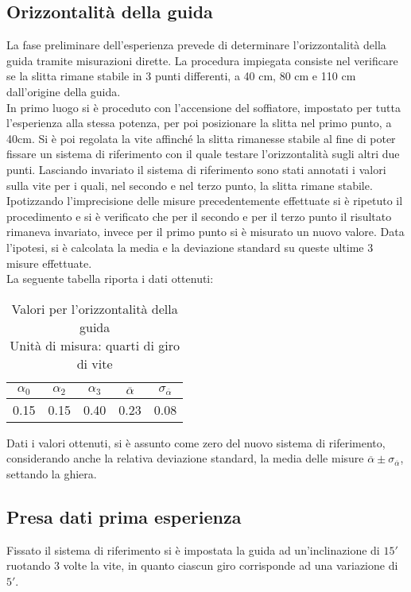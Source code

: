 \documentclass[a4paper,11pt,oneside]{article}
\begin{document}
\subsection{Orizzontalità della guida}
La fase preliminare dell'esperienza prevede di determinare l'orizzontalità della guida tramite misurazioni dirette. La procedura impiegata consiste nel verificare se la slitta rimane stabile in 3 punti differenti, a 40 cm, 80 cm e 110 cm dall'origine della guida.\\
In primo luogo si è proceduto con l'accensione del soffiatore, impostato per tutta l'esperienza alla stessa potenza, per poi posizionare la slitta nel primo punto, a 40cm. Si è poi regolata la vite affinché la slitta rimanesse stabile al fine di poter fissare un sistema di riferimento con il quale testare l'orizzontalità sugli altri due punti. Lasciando invariato il sistema di riferimento sono stati annotati i valori sulla vite per i quali, nel secondo  e nel terzo punto, la slitta rimane stabile.\\
Ipotizzando l'imprecisione delle misure precedentemente effettuate si è ripetuto il procedimento e si è verificato che per il secondo e per il terzo punto il risultato rimaneva invariato, invece per il primo punto si è misurato un nuovo valore. Data l'ipotesi, si è calcolata la media e la deviazione standard su queste ultime 3 misure effettuate.\\
La seguente tabella riporta i dati ottenuti:

\begin{table}[h!]
    \centering
    \caption{Valori per l'orizzontalità della guida \\ Unità di misura: quarti di giro di vite}
\begin{tabular}{ccc|cc}
    \toprule
    $\alpha_{0}$&$\alpha_{2}$&$\alpha_{3}$&$\overline{\alpha}$&$\sigma_{\overline{\alpha}}$\\
    \midrule
    0.15&0.15&0.40&0.23&0.08\\
    \bottomrule
    \end{tabular}
    \label{tab:guida_orizzontale}
\end{table}

Dati i valori ottenuti, si è assunto come zero del nuovo sistema di riferimento, considerando anche la relativa deviazione standard, la media delle misure $\overline{\alpha} \pm \sigma_{\overline{\alpha}}$, settando la ghiera.\\


\subsection{Presa dati prima esperienza}
Fissato il sistema di riferimento si è impostata la guida ad un'inclinazione di $15'$ ruotando 3 volte la vite, in quanto ciascun giro corrisponde ad una variazione  di $5'$.\\
\end{document}

